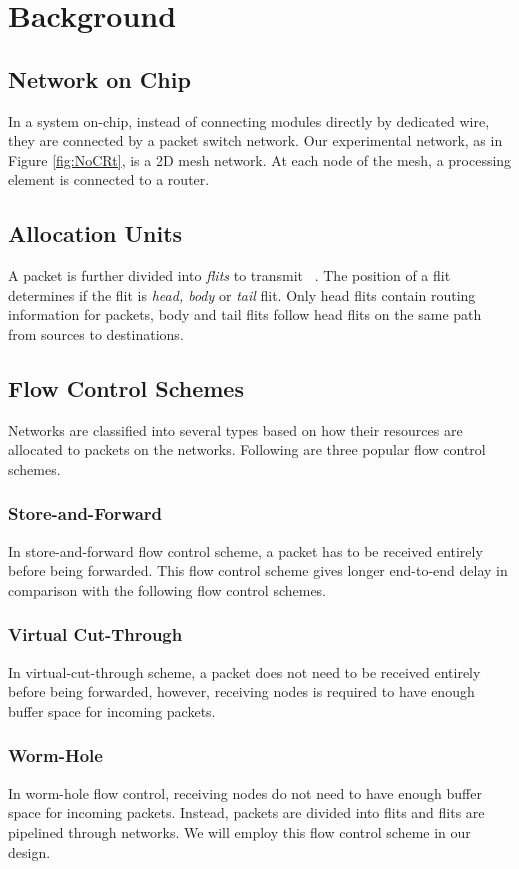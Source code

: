 \documentclass[conference, twocolumn]{IEEEtran}
\theoremstyle{definition}
\begin{document}
\section{Background}
\subsection{Network on Chip}
In a system on-chip, instead of connecting modules directly by dedicated wire,
they are connected by a packet switch network. Our experimental network, as
in Figure \ref{fig:NoCRt}, is a 2D mesh network. At each node of the mesh, a
processing element is connected to a router.

\subsection{Allocation Units}
A packet is further divided into {\em flits} to transmit
~\cite{DallyPrinNetwork}. The position of a flit determines if the flit is {\em
head, body} or {\em tail} flit. Only head flits contain routing information for
packets, body and tail flits follow head flits on the same path from sources to
destinations.
\subsection{Flow Control Schemes}
Networks are classified into several types based on how their resources are
allocated to packets on the networks. Following are three popular flow control
schemes.
\subsubsection{Store-and-Forward}
In store-and-forward flow control scheme, a packet has to be received entirely
before being forwarded. This flow control scheme gives longer end-to-end delay
in comparison with the following flow control schemes.
\subsubsection{Virtual Cut-Through}
In virtual-cut-through scheme, a packet does not need to be received entirely
before being forwarded, however, receiving nodes is required to have enough
buffer space for incoming packets.
\subsubsection{Worm-Hole}
In worm-hole flow control, receiving nodes do not need to have enough buffer
space for incoming packets. Instead, packets are divided into flits and flits
are pipelined through networks. We will employ this flow control scheme in our
design.
\end{document}
